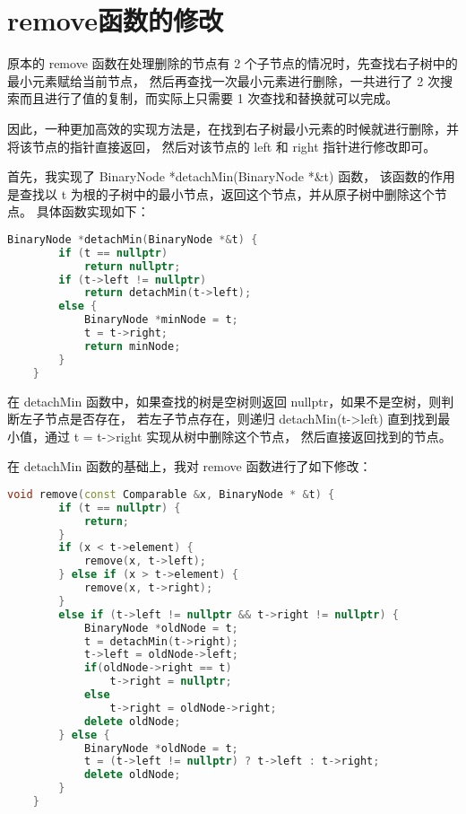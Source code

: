 \documentclass[UTF8]{ctexart}
\begin{document}
\pagestyle{fancy}
\fancyhead{}

\section{remove函数的修改}
原本的 remove 函数在处理删除的节点有 2 个子节点的情况时，先查找右子树中的最小元素赋给当前节点，
然后再查找一次最小元素进行删除，一共进行了 2 次搜索而且进行了值的复制，而实际上只需要 1 次查找和替换就可以完成。

因此，一种更加高效的实现方法是，在找到右子树最小元素的时候就进行删除，并将该节点的指针直接返回，
然后对该节点的 left 和 right 指针进行修改即可。

首先，我实现了 BinaryNode *detachMin(BinaryNode *\&t) 函数，
该函数的作用是查找以 t 为根的子树中的最小节点，返回这个节点，并从原子树中删除这个节点。
具体函数实现如下：
\begin{lstlisting}[language=c++, breaklines=true, keywordstyle=\color{blue!70}, commentstyle=\color{red!50!green!50!blue!50}, frame=shadowbox, rulesepcolor=\color{red!20!green!20!blue!20}]
    BinaryNode *detachMin(BinaryNode *&t) {
        if (t == nullptr)
            return nullptr;
        if (t->left != nullptr)
            return detachMin(t->left);
        else {
            BinaryNode *minNode = t;
            t = t->right;
            return minNode;
        }
    }
\end{lstlisting}

在 detachMin 函数中，如果查找的树是空树则返回 nullptr，如果不是空树，则判断左子节点是否存在，
若左子节点存在，则递归 detachMin(t->left) 直到找到最小值，通过 t = t->right 实现从树中删除这个节点，
然后直接返回找到的节点。

在 detachMin 函数的基础上，我对 remove 函数进行了如下修改：
\begin{lstlisting}[language=c++, breaklines=true, keywordstyle=\color{blue!70}, commentstyle=\color{red!50!green!50!blue!50}, frame=shadowbox, rulesepcolor=\color{red!20!green!20!blue!20}]
    void remove(const Comparable &x, BinaryNode * &t) {
        if (t == nullptr) {
            return; 
        }
        if (x < t->element) {
            remove(x, t->left);
        } else if (x > t->element) {
            remove(x, t->right);
        } 
        else if (t->left != nullptr && t->right != nullptr) { 
            BinaryNode *oldNode = t;
            t = detachMin(t->right); 
            t->left = oldNode->left; 
            if(oldNode->right == t) 
                t->right = nullptr; 
            else
                t->right = oldNode->right;
            delete oldNode;
        } else {
            BinaryNode *oldNode = t;
            t = (t->left != nullptr) ? t->left : t->right;
            delete oldNode;
        }
    }
\end{lstlisting}
\end{document}
